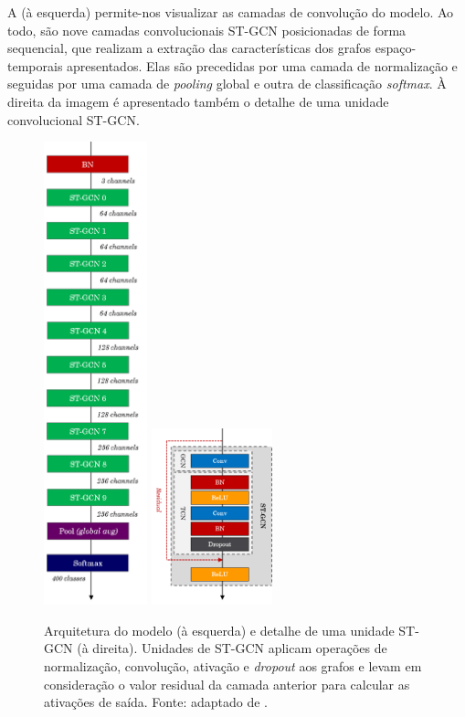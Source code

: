 A  (à esquerda) permite-nos visualizar as camadas de convolução do modelo. Ao todo, são nove camadas convolucionais ST-GCN posicionadas de forma sequencial, que realizam a extração das características dos grafos espaço-temporais apresentados. Elas são precedidas por uma camada de normalização e seguidas por uma camada de \textit{pooling} global e outra de classificação \textit{softmax}. À direita da imagem é apresentado também o detalhe de uma unidade convolucional ST-GCN.

\begin{figure}[ht]
    \centering
    \includegraphics[width=3.0cm]{images/st_gcn_architecture}
    \includegraphics[width=3.5cm]{images/st_gcn_architeture_unit}
    \caption{Arquitetura do modelo (à esquerda) e detalhe de uma unidade ST-GCN (à direita). Unidades de ST-GCN aplicam operações de normalização, convolução, ativação e \textit{dropout} aos grafos e levam em consideração o valor residual da camada anterior para calcular as ativações de saída. Fonte: adaptado de \cite{st-gcn-2018}.}
    \label{fig:st-gcn-architecture}
\end{figure}

